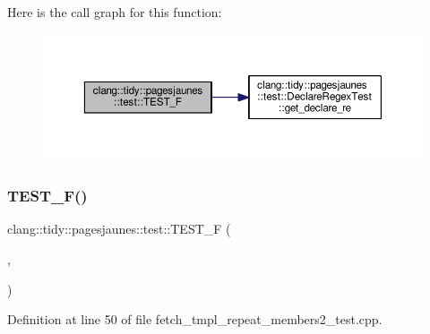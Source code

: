 Here is the call graph for this function\+:
\nopagebreak
\begin{figure}[H]
\begin{center}
\leavevmode
\includegraphics[width=350pt]{namespaceclang_1_1tidy_1_1pagesjaunes_1_1test_a080275839e8bb38170228d7b0d8db4b5_cgraph}
\end{center}
\end{figure}
\mbox{\label{namespaceclang_1_1tidy_1_1pagesjaunes_1_1test_a4cddde8142a52210e1a4a2b2d6245319}} 
\subsubsection{\texorpdfstring{T\+E\+S\+T\+\_\+\+F()}{TEST\_F()}\hspace{0.1cm}{\footnotesize\ttfamily [8/57]}}
{\footnotesize\ttfamily clang\+::tidy\+::pagesjaunes\+::test\+::\+T\+E\+S\+T\+\_\+F (\begin{DoxyParamCaption}\item[{\hyperlink{classclang_1_1tidy_1_1pagesjaunes_1_1test_1_1_fetch_tmpl_repeat_members2_test}{Fetch\+Tmpl\+Repeat\+Members2\+Test}}]{,  }\item[{Templ\+Repeat\+Members2\+Regex\+Matching}]{ }\end{DoxyParamCaption})}



Definition at line 50 of file fetch\+\_\+tmpl\+\_\+repeat\+\_\+members2\+\_\+test.\+cpp.

